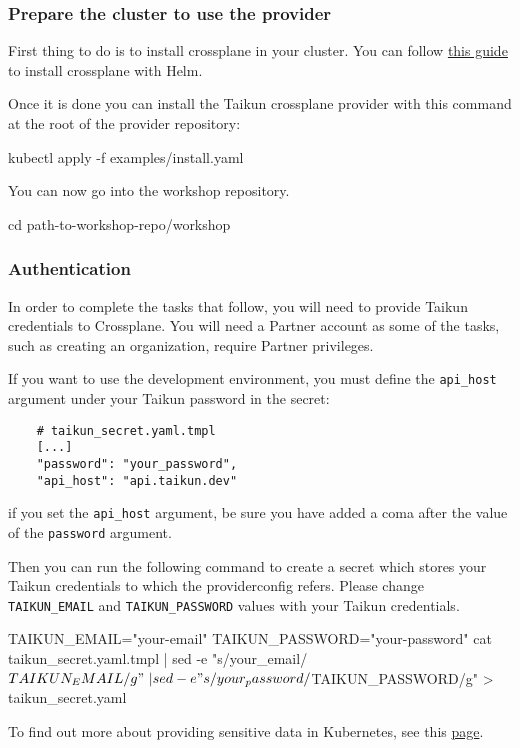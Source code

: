 \subsubsection{Prepare the cluster to use the provider}
First thing to do is to install crossplane in your cluster. You can follow \href{https://crossplane.io/docs/v1.9/getting-started/install-configure.html#install-crossplane}{this guide} to install crossplane with Helm.

Once it is done you can install the Taikun crossplane provider with this command at the root of the provider repository:
\begin{shell}
kubectl apply -f examples/install.yaml
\end{shell}

You can now go into the workshop repository.
\begin{shell}
cd path-to-workshop-repo/workshop
\end{shell}

\subsubsection{Authentication}
In order to complete the tasks that follow, you will need to provide Taikun credentials to Crossplane.
You will need a Partner account as some of the tasks, such as creating an organization,
require Partner privileges.\\

\begin{note}
If you want to use the development environment, you must define the \texttt{api\_host} argument under your Taikun password in the secret:
\begin{verbatim}
    # taikun_secret.yaml.tmpl
    [...]
    "password": "your_password",
    "api_host": "api.taikun.dev"
\end{verbatim}
if you set the \texttt{api\_host} argument, be sure you have added a coma after the value of the \texttt{password} argument.
\end{note}

Then you can run the following command to create a secret which stores your Taikun credentials to which the providerconfig refers.
Please change \texttt{TAIKUN\_EMAIL} and \texttt{TAIKUN\_PASSWORD} values with your Taikun credentials.
\begin{shell}
TAIKUN_EMAIL="your-email"
TAIKUN_PASSWORD="your-password"
cat taikun_secret.yaml.tmpl | sed -e "s/your_email/${TAIKUN_EMAIL}/g" \
| sed -e "s/your_password/${TAIKUN_PASSWORD}/g" > taikun_secret.yaml
\end{shell}
To find out more about providing sensitive data in Kubernetes, see this \href{https://kubernetes.io/docs/concepts/configuration/secret/}{page}.\\

